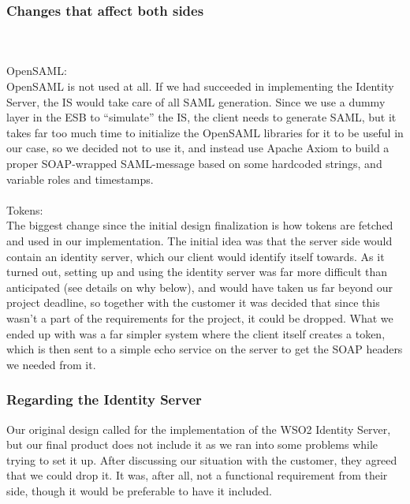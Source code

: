     \subsubsection{Changes that affect both sides}\label{Changes:both}
\\\\
OpenSAML:\\
OpenSAML is not used at all. If we had succeeded in implementing the Identity Server, the IS would take care of all SAML generation. Since we use a dummy layer in the ESB to “simulate” the IS, the client needs to generate SAML, but it takes far too much time to initialize the OpenSAML libraries for it to be useful in our case, so we decided not to use it, and instead use Apache Axiom to build a proper SOAP-wrapped SAML-message based on some hardcoded strings, and variable roles and timestamps.
\\\\
Tokens:\\
The biggest change since the initial design finalization is how tokens are fetched and used in our implementation. The initial idea was that the server side would contain an identity server, which our client would identify itself towards. As it turned out, setting up and using the identity server was far more difficult than anticipated (see details on why below), and would have taken us far beyond our project deadline, so together with the customer it was decided that since this wasn't a part of the requirements for the project, it could be dropped. What we ended up with was a far simpler system where the client itself creates a token, which is then sent to a simple echo service on the server to get the SOAP headers we needed from it.\\

    \subsubsection{Regarding the Identity Server}\label{Changes:IS}
    
    Our original design called for the implementation of the WSO2 Identity Server, but our final product does not include it as we ran into some problems while trying to set it up. After discussing our situation with the customer, they agreed that we could drop it. It was, after all, not a functional requirement from their side, though it would be preferable to have it included.

